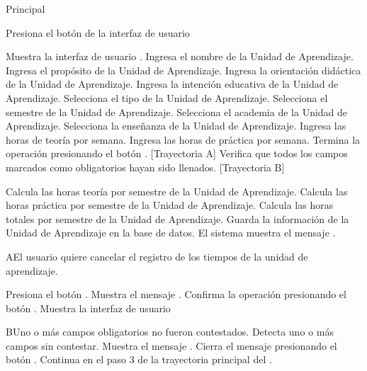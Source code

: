 \begin{UCtrayectoria}{Principal}

    \UCpaso[\UCactor] Presiona el botón  de la interfaz de usuario 

    \UCpaso Muestra la interfaz de usuario .
    \UCpaso[\UCactor] Ingresa el nombre de la Unidad de Aprendizaje.
    \UCpaso[\UCactor] Ingresa el propósito de la Unidad de Aprendizaje.
    \UCpaso[\UCactor] Ingresa la orientación didáctica de la Unidad de Aprendizaje.
    \UCpaso[\UCactor] Ingresa la intención educativa de la Unidad de Aprendizaje.
    \UCpaso[\UCactor] Selecciona el tipo de la Unidad de Aprendizaje.
    \UCpaso[\UCactor] Selecciona el semestre de la Unidad de Aprendizaje.
    \UCpaso[\UCactor] Selecciona el academia de la Unidad de Aprendizaje.
    \UCpaso[\UCactor] Selecciona la enseñanza de la Unidad de Aprendizaje.
    \UCpaso[\UCactor] Ingresa las horas de teoría por semana.
    \UCpaso[\UCactor] Ingresa las horas de práctica por semana.
    \UCpaso[\UCactor] Termina la operación presionando el botón . [Trayectoria A]
    \UCpaso Verifica que todos los campos marcados como obligatorios hayan sido llenados. [Trayectoria B]

    \UCpaso Calcula las horas teoría por semestre de la Unidad de Aprendizaje.
    \UCpaso Calcula las horas práctica por semestre de la Unidad de Aprendizaje.
    \UCpaso Calcula las horas totales por semestre de la Unidad de Aprendizaje.
    \UCpaso Guarda la información de la Unidad de Aprendizaje en la base de datos.
    \UCpaso El sistema muestra el mensaje .
\end{UCtrayectoria}

\begin{UCtrayectoriaA}{A}{El usuario quiere cancelar el registro de los tiempos de la unidad de aprendizaje.}

    \UCpaso[\UCactor] Presiona el botón .
    \UCpaso Muestra el mensaje .
    \UCpaso[\UCactor] Confirma la operación presionando el botón .
    \UCpaso Muestra la interfaz de usuario 

\end{UCtrayectoriaA}


\begin{UCtrayectoriaA}{B}{Uno o más campos obligatorios no fueron contestados.}
    \UCpaso Detecta uno o más campos sin contestar.
    \UCpaso Muestra el mensaje .
    \UCpaso[\UCactor] Cierra el mensaje presionando el botón .
    \UCpaso Continua en el paso 3 de la trayectoria principal del .
\end{UCtrayectoriaA}